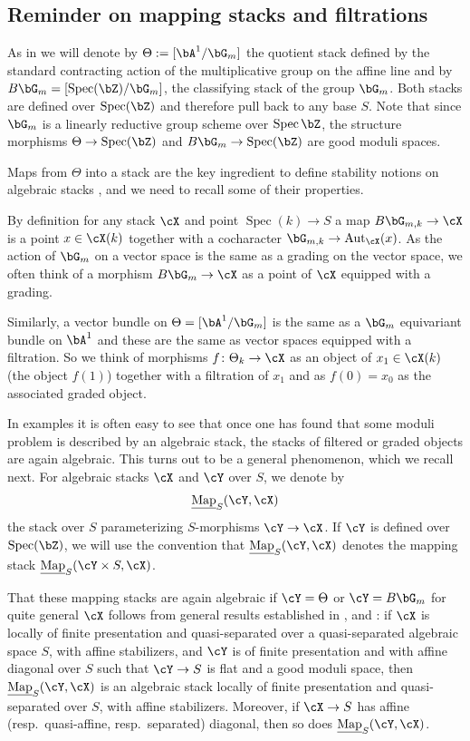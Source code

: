 \documentclass[a4paper]{amsart}
\numberwithin{equation}{section}
\theoremstyle{plain}
\theoremstyle{definition}
\DeclareMathOperator{\Spec}{Spec}
\DeclareMathOperator{\Aut}{Aut}
\newcommand{\uMap}{\underline{{\rm Map}}}
\newcommand{\co}{\colon}
\begin{document}
\subsection{Reminder on mapping stacks and filtrations}

As in \cite{hlinstability} we will denote by $\Theta:=[\bA^1/\bG_m]$ the quotient stack defined by the standard contracting action of the multiplicative group on the affine line and by $B\bG_m=[\Spec(\bZ)/\bG_m]$, the classifying stack of the group $\bG_m$. Both stacks are defined over $\Spec(\bZ)$ and therefore pull back to any base $S$.
Note that since $\bG_m$ is a linearly reductive group {scheme over $\Spec \bZ$}, the structure morphisms $\Theta \to \Spec(\bZ)$ and $B\bG_m \to \Spec(\bZ)$ are good moduli spaces.

Maps from $\Theta$  into a stack are the key ingredient to define stability notions on algebraic stacks \cite{hlinstability,heinloth-stability}, and we need to recall some of their properties.

By definition for any stack $\cX$ and point $\Spec(k) \to S$ a map $B\bG_{m,k} \to \cX$ is a point $x\in \cX(k)$ together with a cocharacter $\bG_{m,k} \to \Aut_{\cX}(x)$. As the action of $\bG_m$ on a vector space is the same as a grading on the vector space, we often think of a morphism $B\bG_{m}\to \cX$ as a point of $\cX$ equipped with a grading.

Similarly, a vector bundle on $\Theta=[\bA^1/\bG_m]$ is the same as a $\bG_m$ equivariant bundle on $\bA^1$ and these are the same as vector spaces equipped with a filtration. So we think of morphisms $f\co \Theta_k \to \cX$ as an object of $x_1\in \cX(k)$ (the object $f(1)$) together with a filtration of $x_1$ and as $f(0)=x_0$ as the associated graded object. 

In examples it is often easy to see that once one has found that some moduli problem is described by an algebraic stack, the stacks of filtered or graded objects are again algebraic. This turns out to be a general phenomenon, which we recall next. 
For algebraic stacks $\cX$ and $\cY$ over $S$, we denote by 
$$\uMap_S(\cY, \cX)$$ 
the stack over $S$ parameterizing $S$-morphisms $\cY \to \cX$.   If $\cY$ is defined over $\Spec(\bZ)$, we will use the convention that $\uMap_S(\cY, \cX)$ denotes the mapping stack $\uMap_S(\cY \times S, \cX)$.

That these mapping stacks are again algebraic if $\cY=\Theta$ or $\cY=B\bG_m$  for quite general $\cX$ follows from general results established in \cite[Thm.~14.9]{ahr2}, \cite[Prop.~1.1.2]{hlinstability} and \cite[Thm.~1.6]{hlp}:  if $\cX$ is locally of finite presentation and quasi-separated over a quasi-separated algebraic space $S$, with affine stabilizers, and $\cY$ is of finite presentation and with affine diagonal over $S$ such that $\cY \to S$ is flat and a good moduli space, then $\uMap_S(\cY, \cX)$ is an algebraic stack locally of finite presentation and quasi-separated over $S$, with affine stabilizers.  Moreover, if $\cX \to S$ has affine (resp.\ quasi-affine, resp.\ separated) diagonal, then so does $\uMap_S(\cY,\cX)$.
\end{document}
